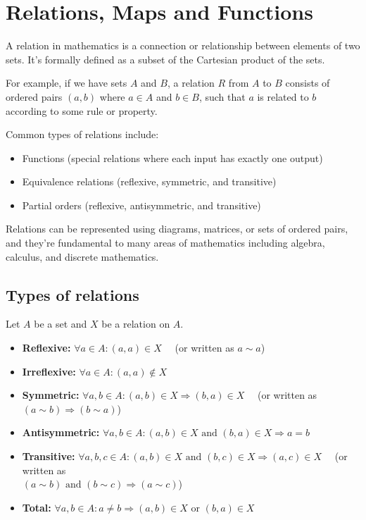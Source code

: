 \section{Relations, Maps and Functions}
A relation in mathematics is a connection or relationship between elements of two sets. It's formally defined as a subset of the Cartesian product of the sets.

For example, if we have sets $A$ and $B$, a relation $R$ from $A$ to $B$ consists of ordered pairs $(a,b)$ where $a \in A$ and $b \in B$, such that $a$ is related to $b$ according to some rule or property.

Common types of relations include:
\begin{itemize}
    \item Functions (special relations where each input has exactly one output)
    \item Equivalence relations (reflexive, symmetric, and transitive)
    \item Partial orders (reflexive, antisymmetric, and transitive)
\end{itemize}

Relations can be represented using diagrams, matrices, or sets of ordered pairs, and they're fundamental to many areas of mathematics including algebra, calculus, and discrete mathematics.

\subsection{Types of relations}

Let $A$ be a set and $X$ be a relation on $A$.

\begin{itemize}
    \item \textbf{Reflexive:} $\forall a \in A: (a, a) \in X$ \ \ (or written as $a \sim a$)
    
    \item \textbf{Irreflexive:} $\forall a \in A: (a, a) \not\in X$
    
    \item \textbf{Symmetric:} $\forall a, b \in A: (a, b) \in X \Rightarrow (b, a) \in X$ \ \ (or written as $(a \sim b) \Rightarrow (b \sim a)$)
    
    \item \textbf{Antisymmetric:} $\forall a, b \in A: (a, b) \in X \text{ and } (b, a) \in X \Rightarrow a = b$
    
    \item \textbf{Transitive:} $\forall a, b, c \in A: (a, b) \in X \text{ and } (b, c) \in X \Rightarrow (a, c) \in X$ \ \ (or written as \\$(a \sim b) \text{ and } (b \sim c) \Rightarrow (a \sim c)$)
    
    \item \textbf{Total:} $\forall a, b \in A: a \neq b \Rightarrow (a, b) \in X \text{ or } (b, a) \in X$
\end{itemize}

